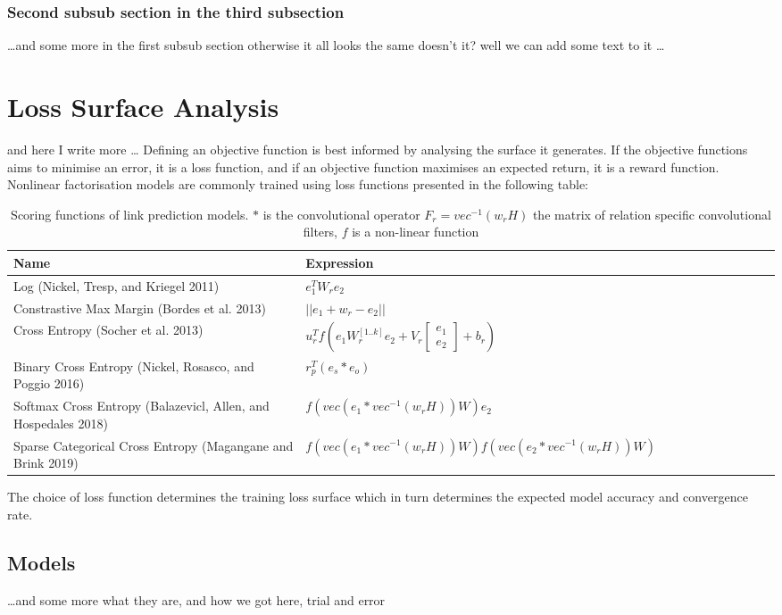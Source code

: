 \subsubsection{Second subsub section in the third subsection}
\dots and some more in the first subsub section otherwise it all looks the same
doesn't it? well we can add some text to it \dots

\section{Loss Surface Analysis}
and here I write more \dots
Defining an objective function is best informed by analysing the surface it generates. If the objective functions aims to minimise an error, it is a loss function, and if an objective function maximises an expected return, it is a reward function. Nonlinear factorisation models are commonly trained using loss functions presented in the following table:
\begin{table}[H]
\centering
\begin{tabular}{lllllllllll}
  \textbf{Name} & \textbf{Expression} \\
  \hline
  Log (Nickel, Tresp, and Kriegel 2011) & $e^T_1W_r e_2$  \\
  Constrastive Max Margin (Bordes et al. 2013) & $|| e_1 + w_r - e_2 ||$ \\
  Cross Entropy (Socher et al. 2013) & $u^T_r f(e_1W_r^{[1..k]} e_2 + V_r \begin{bmatrix}e_1 \\ e_2\end{bmatrix} + b_r)$ \\
  Binary Cross Entropy (Nickel, Rosasco, and Poggio 2016) & $r^T_p(e_s * e_o)$ \\
  Softmax Cross Entropy (Balazevicl, Allen, and Hospedales 2018) & $f(vec(e_1 * vec^{-1}(w_rH))W)e_2$ \\
  Sparse Categorical Cross Entropy (Magangane and Brink 2019) & $f(vec(e_1 * vec^{-1}(w_rH))W)f(vec(e_2 * vec^{-1}(w_rH))W)$
\end{tabular}
 \caption {Scoring functions of link prediction models. $*$ is the convolutional operator $F_r = vec^{-1}(w_rH)$ the matrix of relation specific convolutional filters, $f$ is a non-linear function}
\end{table} 
The choice of loss function determines the training loss surface which in turn determines the expected model accuracy and convergence rate.

\subsection{Models}
\dots and some more 
what they are, and how we got here, trial and error

